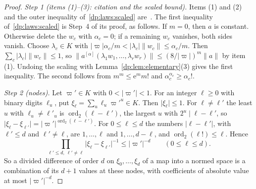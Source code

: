 \documentclass[11pt]{amsart}
\theoremstyle{definition}
\theoremstyle{remark}
\numberwithin{equation}{section}
\newcommand{\abs}[1]{\lvert #1\rvert}
\newcommand{\norm}[1]{\lVert #1\rVert}
\newcommand{\ord}{\operatorname{ord}}
\theoremstyle{plain}
\theoremstyle{definition}
\theoremstyle{plain}
\begin{document}
\begin{proof}
\emph{Step 1 (items (1)--(3): citation and the scaled bound).} Items (1) and (2) and the outer inequality of~\eqref{dp:laws:scaled} are~\cite[Lemma~Q.2(1),(2),(3)]{I}. The first inequality of~\eqref{dp:laws:scaled} is Step~4 of its proof, as follows. If $m=0$, then $a$ is constant. Otherwise delete the $w_c$ with $\alpha_c=0$; if a remaining $w_c$ vanishes, both sides vanish. Choose $\lambda_c\in K$ with $\abs\varpi\alpha_c/m<\abs{\lambda_c}\norm{w_c}\le\alpha_c/m$. Then $\sum_c\abs{\lambda_c}\norm{w_c}\le1$, so $\norm{a^{[\alpha]}(\lambda_1w_1,\dots,\lambda_rw_r)}\le(8/\abs\varpi)^m\norm a$ by item (1). Undoing the scaling with Lemma~\ref{dp:lem:elementary}(3) gives the first inequality. The second follows from $m^m\le\mathrm e^mm!$ and $\alpha_c^{\alpha_c}\ge\alpha_c!$.

\emph{Step 2 (nodes).} Let $\varpi'\in K$ with $0<\abs{\varpi'}<1$. For an integer $\ell\ge0$ with binary digits $\ell_u$, put $\xi_\ell=\sum_u\ell_u\varpi'^u\in K$. Then $\abs{\xi_\ell}\le1$. For $\ell\ne\ell'$ the least $u$ with $\ell_u\ne\ell'_u$ is $\ord_2(\ell-\ell')$, the largest $u$ with $2^u\mid\ell-\ell'$, so $\abs{\xi_\ell-\xi_{\ell'}}=\abs{\varpi'}^{\ord_2(\ell-\ell')}$. For $0\le\ell\le d$ the numbers $\abs{\ell-\ell'}$, with $\ell'\le d$ and $\ell'\ne\ell$, are $1,\dots,\ell$ and $1,\dots,d-\ell$, and $\ord_2(\ell!)\le\ell$. Hence
\begin{equation}\label{dp:laws:nodes}
 \prod_{\ell'\le d,\ \ell'\ne\ell}\abs{\xi_\ell-\xi_{\ell'}}^{-1}\le\abs{\varpi'}^{-d}\qquad(0\le\ell\le d).
\end{equation}
So a divided difference of order $d$ on $\xi_0,\dots,\xi_d$ of a map into a normed space is a combination of its $d+1$ values at these nodes, with coefficients of absolute value at most $\abs{\varpi'}^{-d}$.


\end{proof}
\end{document}
